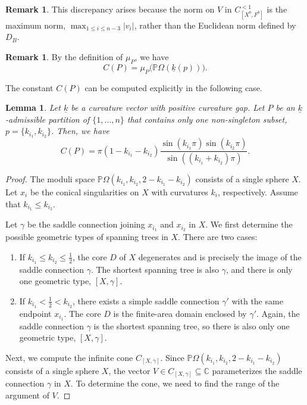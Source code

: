 \documentclass{compositio}
\numberwithin{equation}{section}
\numberwithin{figure}{section}
\theoremstyle{definition}
\newtheorem{remark}[definition]{Remark}
\theoremstyle{plain}
\newtheorem{lemma}[definition]{Lemma}
\begin{document}
{\begin{remark}
    This discrepancy arises because the norm on $V$ in $C_{[X^b,F^b]}^{<1}$ is the maximum norm, $\max_{1\leq i\leq n-3}|v_i|$, rather than the Euclidean norm defined by $D_B$.
\end{remark}

\begin{remark}
    By the definition of $\mu_P$, we have
    $$
    C(P) = \mu_P\big(\mathbb{P}\Omega(\underline{k}(p))\big).
    $$    
\end{remark}

The constant $C(P)$ can be computed explicitly in the following case.

\begin{lemma}\label{lem:cod1}
    Let $\underline{k}$ be a curvature vector with positive curvature gap. Let $P$ be an $\underline{k}$-admissible partition of $\{1,\ldots,n\}$ that contains only one non-singleton subset, $p = \{k_{i_1}, k_{i_2}\}$. Then, we have
    $$
    C(P) = \pi(1 - k_{i_1} - k_{i_2}) \frac{\sin{(k_{i_1}\pi)}\sin{(k_{i_2}\pi)}}{\sin{((k_{i_1}+k_{i_2})\pi)}}.
    $$
\end{lemma}

\begin{proof}
    The moduli space $\mathbb{P}\Omega(k_{i_1}, k_{i_2}, 2 - k_{i_1} -k_{i_2})$ consists of a single sphere $X$. Let $x_i$ be the conical singularities on $X$ with curvatures $k_i$, respectively. Assume that $k_{i_1}\le k_{i_2}$. 
    
    Let $\gamma$ be the saddle connection joining $x_{i_1}$ and $x_{i_2}$ in $X$. We first determine the possible geometric types of spanning trees in $X$. There are two cases:
    \begin{enumerate}
        \item If $k_{i_1}\le k_{i_2}\le \frac{1}{2}$, the core $D$ of $X$ degenerates and is precisely the image of the saddle connection $\gamma$. The shortest spanning tree is also $\gamma$, and there is only one geometric type, $[X,\gamma]$.
        \item If $k_{i_1}< \frac{1}{2} < k_{i_2}$, there exists a simple saddle connection $\gamma'$ with the same endpoint $x_{i_1}$. The core $D$ is the finite-area domain enclosed by $\gamma'$. Again, the saddle connection $\gamma$ is the shortest spanning tree, so there is also only one geometric type, $[X,\gamma]$.
    \end{enumerate}

    Next, we compute the infinite cone $C_{[X,\gamma]}$. Since $\mathbb{P}\Omega( k_{i_1}, k_{i_2}, 2 - k_{i_1} -k_{i_2})$ consists of a single sphere $X$, the vector $V\in C_{[X,\gamma]}\subseteq \mathbb{C}$ parameterizes the saddle connection $\gamma$ in $X$. To determine the cone, we need to find the range of the argument of $V$.
    

\end{proof}}
\end{document}
